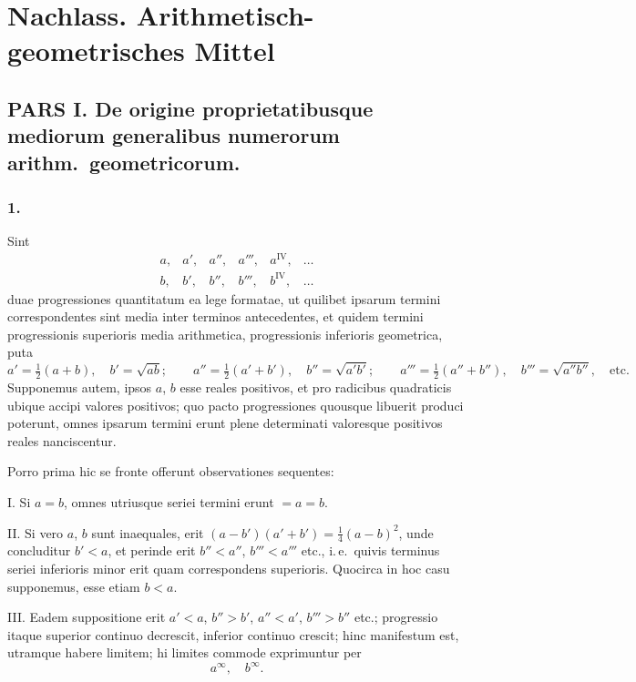 \documentclass[12pt,a4paper]{article}
\begin{document}
\newpage
\section*{Nachlass. Arithmetisch-geometrisches Mittel}

\subsection*{PARS I. De origine proprietatibusque mediorum generalibus numerorum arithm.\ geometricorum.}

\setcounter{subsection}{0}
\subsubsection*{1.}

Sint
\[
\begin{array}{cccccc}
a, & a', & a'', & a''', & a^{\mathrm{IV}}, & \dots \\
b, & b', & b'', & b''', & b^{\mathrm{IV}}, & \dots
\end{array}
\]
duae progressiones quantitatum ea lege formatae, ut quilibet ipsarum termini correspondentes sint media inter terminos antecedentes, et quidem termini progressionis superioris media arithmetica, progressionis inferioris geometrica, puta
\[
a' = \tfrac{1}{2}(a+b), \quad b' = \sqrt{ab}; \qquad
a'' = \tfrac{1}{2}(a'+b'), \quad b'' = \sqrt{a'b'}; \qquad
a''' = \tfrac{1}{2}(a''+b''), \quad b''' = \sqrt{a''b''}, \quad\text{etc.}
\]
Supponemus autem, ipsos $a$, $b$ esse reales positivos, et pro radicibus quadraticis ubique accipi valores positivos; quo pacto progressiones quousque libuerit produci poterunt, omnes ipsarum termini erunt plene determinati valoresque positivos reales nanciscentur.

Porro prima hic se fronte offerunt observationes sequentes:

\textsc{I.} Si $a=b$, omnes utriusque seriei termini erunt $=a=b$.

\textsc{II.} Si vero $a$, $b$ sunt inaequales, erit $(a-b')(a'+b') = \frac{1}{4}(a-b)^2$, unde concluditur $b'<a$, et perinde erit $b''<a''$, $b'''<a'''$ etc., i.\,e.\ quivis terminus seriei inferioris minor erit quam correspondens superioris. Quocirca in hoc casu supponemus, esse etiam $b<a$.

\textsc{III.} Eadem suppositione erit $a'<a$, $b''>b'$, $a''<a'$, $b'''>b''$ etc.; progressio itaque superior continuo decrescit, inferior continuo crescit; hinc manifestum est, utramque habere limitem; hi limites commode exprimuntur per
\[
a^{\infty}, \quad b^{\infty}.
\]
\end{document}
